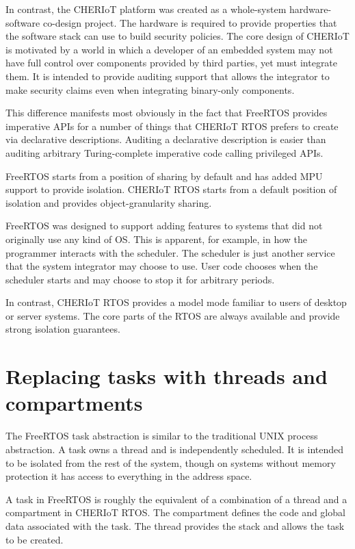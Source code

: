In contrast, the CHERIoT platform was created as a whole-system hardware-software co-design project.
The hardware is required to provide properties that the software stack can use to build security policies.
The core design of CHERIoT is motivated by a world in which a developer of an embedded system may not have full control over components provided by third parties, yet must integrate them.
It is intended to provide auditing support that allows the integrator to make security claims even when integrating binary-only components.

This difference manifests most obviously in the fact that FreeRTOS provides imperative APIs for a number of things that CHERIoT RTOS prefers to create via declarative descriptions.
Auditing a declarative description is easier than auditing arbitrary Turing-complete imperative code calling privileged APIs.

FreeRTOS starts from a position of sharing by default and has added MPU support to provide isolation.
CHERIoT RTOS starts from a default position of isolation and provides object-granularity sharing.

FreeRTOS was designed to support adding features to systems that did not originally use any kind of OS.
This is apparent, for example, in how the programmer interacts with the scheduler.
The scheduler is just another service that the system integrator may choose to use.
User code chooses when the scheduler starts and may choose to stop it for arbitrary periods.

In contrast, CHERIoT RTOS provides a model mode familiar to users of desktop or server systems.
The core parts of the RTOS are always available and provide strong isolation guarantees.

\section{Replacing tasks with threads and compartments}

The FreeRTOS task abstraction is similar to the traditional UNIX process abstraction.
A task owns a thread and is independently scheduled.
It is intended to be isolated from the rest of the system, though on systems without memory protection it has access to everything in the address space.

A task in FreeRTOS is roughly the equivalent of a combination of a thread and a compartment in CHERIoT RTOS.
The compartment defines the code and global data associated with the task.
The thread provides the stack and allows the task to be created.


